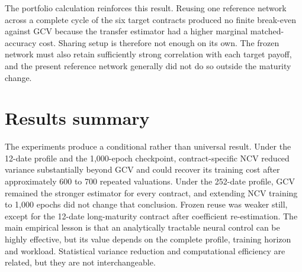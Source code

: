The portfolio calculation reinforces this result. Reusing one reference network across a complete cycle of the six target contracts produced no finite break-even against GCV because the transfer estimator had a higher marginal matched-accuracy cost. Sharing setup is therefore not enough on its own. The frozen network must also retain sufficiently strong correlation with each target payoff, and the present reference network generally did not do so outside the maturity change.

\section{Results summary}

The experiments produce a conditional rather than universal result. Under the 12-date profile and the 1{,}000-epoch checkpoint, contract-specific NCV reduced variance substantially beyond GCV and could recover its training cost after approximately 600 to 700 repeated valuations. Under the 252-date profile, GCV remained the stronger estimator for every contract, and extending NCV training to 1{,}000 epochs did not change that conclusion. Frozen reuse was weaker still, except for the 12-date long-maturity contract after coefficient re-estimation. The main empirical lesson is that an analytically tractable neural control can be highly effective, but its value depends on the complete profile, training horizon and workload. Statistical variance reduction and computational efficiency are related, but they are not interchangeable.
